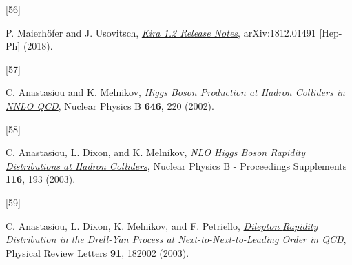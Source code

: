 \documentclass[
  10pt,
  a4paper,
  DIV=11,
  numbers=noendperiod,
  twoside]{scrreprt}
\newlength{\cslhangindent}
\newlength{\csllabelwidth}
\newlength{\cslentryspacingunit} %
\newenvironment{CSLReferences}[2] %
 {%
  \setlength{\parindent}{0pt}
  \ifodd #1
  \let\oldpar\par
  \def\par{\hangindent=\cslhangindent\oldpar}
  \fi
  \setlength{\parskip}{#2\cslentryspacingunit}
 }%
 {}
\newcommand{\CSLLeftMargin}[1]{\parbox[t]{\csllabelwidth}{#1}}
\newcommand{\CSLRightInline}[1]{\parbox[t]{\linewidth - \csllabelwidth}{#1}\break}
\DeclareRobustCommand{\[}{\begin{equation}}
\DeclareRobustCommand{\]}{\end{equation}}
\begin{document}
\begin{CSLReferences}{0}{0}
\leavevmode{}%
\CSLLeftMargin{{[}56{]} }%
\CSLRightInline{P. Maierhöfer and J. Usovitsch,
\emph{\href{https://arxiv.org/abs/1812.01491}{Kira 1.2 {Release
Notes}}}, arXiv:1812.01491 {[}Hep-Ph{]} (2018).}

\leavevmode{}%
\CSLLeftMargin{{[}57{]} }%
\CSLRightInline{C. Anastasiou and K. Melnikov,
\emph{\href{https://doi.org/10.1016/S0550-3213(02)00837-4}{Higgs Boson
Production at Hadron Colliders in {NNLO QCD}}}, Nuclear Physics B
\textbf{646}, 220 (2002).}

\leavevmode{}%
\CSLLeftMargin{{[}58{]} }%
\CSLRightInline{C. Anastasiou, L. Dixon, and K. Melnikov,
\emph{\href{https://doi.org/10.1016/S0920-5632(03)80168-8}{{NLO Higgs}
Boson Rapidity Distributions at Hadron Colliders}}, Nuclear Physics B -
Proceedings Supplements \textbf{116}, 193 (2003).}

\leavevmode{}%
\CSLLeftMargin{{[}59{]} }%
\CSLRightInline{C. Anastasiou, L. Dixon, K. Melnikov, and F. Petriello,
\emph{\href{https://doi.org/10.1103/PhysRevLett.91.182002}{Dilepton
{Rapidity Distribution} in the {Drell-Yan Process} at
{Next-to-Next-to-Leading Order} in {QCD}}}, Physical Review Letters
\textbf{91}, 182002 (2003).}

\end{CSLReferences}
\end{document}
